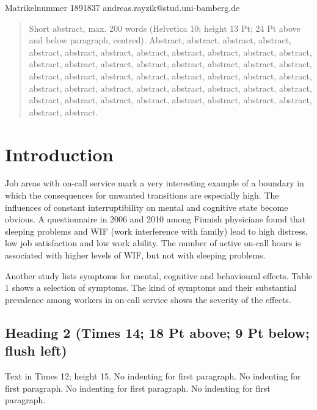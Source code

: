 \documentclass{CML_Seminar_Template}
\begin{document}

\author{Andreas Rayzik}
       {Matrikelnummer 1891837}
       {andreas.rayzik@stud.uni-bamberg.de}

\begin{abstract}
Short abstract, max. 200 words  (Helvetica 10; height 13 Pt; 24 Pt above and below paragraph, centred). Abstract, abstract, abstract, abstract, abstract, abstract, abstract, abstract, abstract, abstract, abstract, abstract, abstract, abstract, abstract, abstract, abstract, abstract, abstract, abstract, abstract, abstract, abstract, abstract, abstract, abstract, abstract, abstract, abstract, abstract, abstract, abstract, abstract, abstract, abstract, abstract, abstract, abstract, abstract, abstract, abstract, abstract, abstract, abstract, abstract, abstract. 
\end{abstract}

\vspace{24pt}

\section{Introduction}

Job areas with on-call service mark a very interesting example of a boundary in which the consequences for unwanted transitions are especially high. The influences of constant interruptibility on mental and cognitive state become obvious. A questionnaire in 2006 and 2010 among Finnish physicians found that sleeping problems and WIF (work interference with family) lead to high distress, low job satisfaction and low work ability. The number of active on-call hours is associated with higher levels of WIF, but not with sleeping problems.
\par
Another study lists symptoms for mental, cognitive and behavioural effects. Table 1 shows a selection of symptoms. The kind of symptoms and their substantial prevalence among workers in on-call service shows the severity of the effects.

\subsection{Heading 2 (Times 14; 18 Pt above; 9 Pt below; flush left)}

Text in Times 12; height 15. No indenting for first paragraph. No indenting for first paragraph. No indenting for first paragraph. No indenting for first paragraph. 
\end{document}
